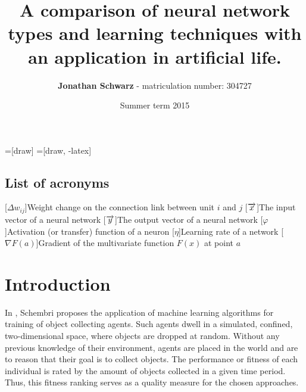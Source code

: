 \documentclass[10pt,a4paper,DIV=11]{scrreprt}
\title
{
     A comparison of neural network types and learning techniques with an application in artificial life.
}
\author
{
    \textbf{Jonathan Schwarz} - matriculation number: 304727
}
\date
{
    Summer term 2015
}
\begin{document}
=[draw]
=[draw, -latex] 


\maketitle
\thispagestyle{empty}
\newpage
{\large\tableofcontents}
\newpage

\thispagestyle{empty}

\section*{List of acronyms}
\begin{acronym}
    [$\Delta w_{ij}$]{Weight change on the connection link between unit $i$ and $j$}
    [$\protect \overrightarrow{x}$]{The input vector of a neural network}
    [$\protect \overrightarrow{y}$]{The output vector of a neural network}
    [$\varphi$]{Activation (or transfer) function of a neuron}
    [$\eta$]{Learning rate of a network}
    [$\nabla F(a)$]{Gradient of the multivariate function $F(x)$ at point $a$}
\end{acronym}

\newpage

\chapter{Introduction}
\label{ch:intro}
In \cite{DANIEL}, Schembri proposes the application of machine learning algorithms for training of object collecting agents. 
Such agents dwell in a simulated, confined, two-dimensional space, where objects are dropped at random. Without any previous knowledge of 
their environment, agents are placed in the world and are to reason that their goal is to collect objects. The performance or fitness of each 
individual is rated by the amount of objects collected in a given time period. Thus, this fitness ranking serves as a quality measure for the 
chosen approaches.
\end{document}
